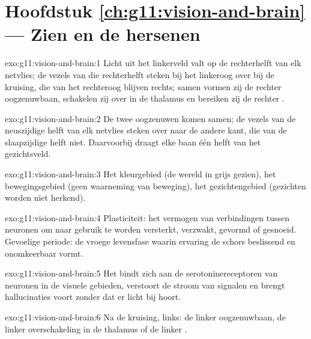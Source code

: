 \section*{Hoofdstuk \ref{ch:g11:vision-and-brain} --- Zien en de hersenen}

\begin{solution}{exo:g11:vision-and-brain:1}
Licht uit het linkerveld valt op de rechterhelft van elk netvlies; de
vezels van die rechterhelft steken bij het linkeroog over bij de
kruising, die van het rechteroog blijven rechts; samen vormen zij de
rechter oogzenuwbaan, schakelen zij over in de thalamus en bereiken zij de
rechter .
\end{solution}

\begin{solution}{exo:g11:vision-and-brain:2}
De twee oogzenuwen komen samen; de vezels van de neuszijdige helft van elk
netvlies steken over naar de andere kant, die van de slaapzijdige helft
niet. Daarvoorbij draagt elke baan één helft van het gezichtsveld.
\end{solution}

\begin{solution}{exo:g11:vision-and-brain:3}
Het kleurgebied (de wereld in grijs gezien), het bewegingsgebied (geen
waarneming van beweging), het gezichtengebied (gezichten worden niet
herkend).
\end{solution}

\begin{solution}{exo:g11:vision-and-brain:4}
Plasticiteit: het vermogen van verbindingen tussen neuronen om naar
gebruik te worden versterkt, verzwakt, gevormd of gesnoeid. Gevoelige
periode: de vroege levensfase waarin ervaring de schors beslissend en
onomkeerbaar vormt.
\end{solution}

\begin{solution}{exo:g11:vision-and-brain:5}
Het bindt zich aan de serotoninereceptoren van neuronen in de visuele
gebieden, verstoort de stroom van signalen en brengt hallucinaties voort
zonder dat er licht bij hoort.
\end{solution}

\begin{solution}{exo:g11:vision-and-brain:6}
Na de kruising, links: de linker oogzenuwbaan, de linker overschakeling in
de thalamus of de linker .
\end{solution}

